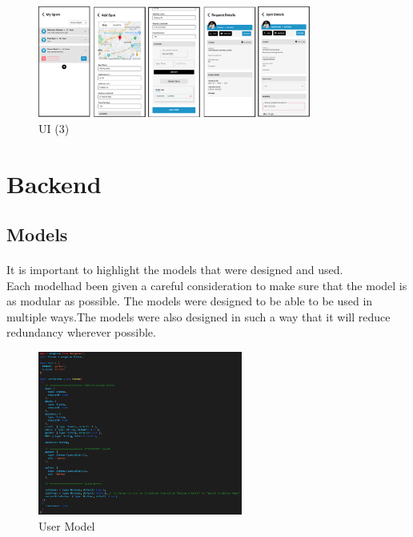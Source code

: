                     
                    \begin{figure}[h]
                        \centering
                        \includegraphics[width=0.8\textwidth]{images/ui3.png}
                        \caption{UI (3)}
                        \label{fig:ui3}
                    \end{figure}

                \pagebreak
                \clearpage
                    
                \section{Backend}
                \subsection{Models}
                \paragraph*{}
                    It is important to highlight the models that were designed and used. \\Each modelhad been given a careful consideration to make sure that the model is as modular as possible. The models were designed to be able to be used in multiple ways.The models were also designed in such a way that it will reduce redundancy wherever possible.\\

                    \begin{figure}[h]
                        \centering
                        \includegraphics[width=0.6\textwidth]{images/userModel.png}
                        \caption{User Model}
                        \label{fig:userModel}
                    \end{figure}
         
